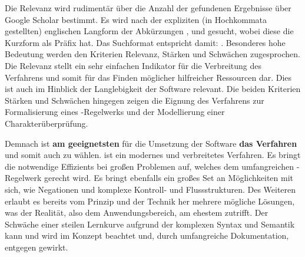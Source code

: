 Die Relevanz wird rudimentär über die Anzahl der gefundenen Ergebnisse über Google Scholar bestimmt.
Es wird nach der expliziten (in Hochkommata gestellten) englischen Langform der Abkürzungen ,  und  gesucht, wobei diese die Kurzform als Präfix hat.
Das Suchformat entspricht damit: .
Besonderes hohe Bedeutung werden den Kriterien Relevanz, Stärken und Schwächen zugesprochen.
Die Relevanz stellt ein sehr einfachen Indikator für die Verbreitung des Verfahrens und somit für das Finden möglicher hilfreicher Ressourcen dar.
Dies ist auch im Hinblick der Langlebigkeit der Software relevant.
Die beiden Kriterien Stärken und Schwächen hingegen zeigen \insb die Eignung des Verfahrens zur Formalisierung eines -Regelwerks und der Modellierung einer Charakterüberprüfung.

Demnach ist \textbf{am geeignetsten} für die Umsetzung der Software \textbf{das Verfahren } und somit auch zu wählen.
 ist ein modernes und verbreitetes Verfahren.
Es bringt die notwendige Effizients bei großen Problemen auf, welches dem umfangreichen -Regelwerk gerecht wird.
Es bringt ebenfalls ein großes Set an Möglichkeiten mit sich, wie \zB Negationen und komplexe Kontroll- und Flussstrukturen.
Des Weiteren erlaubt es bereits vom Prinzip und der Technik her mehrere mögliche Lösungen, was der Realität, also dem Anwendungsbereich, am ehestem zutrifft.
Der Schwäche einer steilen Lernkurve aufgrund der komplexen Syntax und Semantik kann und wird im Konzept beachtet und, durch umfangreiche Dokumentation, entgegen gewirkt.